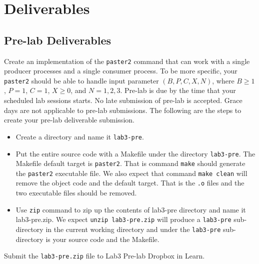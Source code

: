 
\section{Deliverables}
\subsection{Pre-lab Deliverables}
\label{sec:lab3-pre-lab-deliverable}
Create an implementation of the \verb+paster2+ command that can work with a single producer processes and a single consumer process. To be more specific, your \verb+paster2+ should be able to handle input parameter $(B, P, C, X, N)$, where $B \ge 1$, $P = 1$, $C = 1$, $X \ge 0$, and $N = 1, 2, 3$. Pre-lab is due by the time that your scheduled lab sessions starts. No late submission of pre-lab is accepted. Grace days are not applicable to pre-lab submissions. The following are the steps to create your pre-lab deliverable submission.
\begin{itemize}
\item Create a directory and name it \verb+lab3-pre+.
\item Put the entire source code with a Makefile under the directory \verb+lab3-pre+. The Makefile default target is \verb+paster2+. That is command \verb+make+ should generate the \verb+paster2+ executable file. We also expect that command \verb+make clean+ will remove the object code and the default target. That is the \verb+.o+ files and the two executable files should be removed.
\item Use \verb+zip+ command to zip up the contents of lab3-pre directory and name it lab3-pre.zip. We expect \verb+unzip lab3-pre.zip+ will produce a \verb+lab3-pre+ sub-directory in the current working directory and under the \verb+lab3-pre+ sub-directory is your source code and the Makefile.
\end{itemize}
Submit the \verb+lab3-pre.zip+ file to Lab3 Pre-lab Dropbox in Learn.

